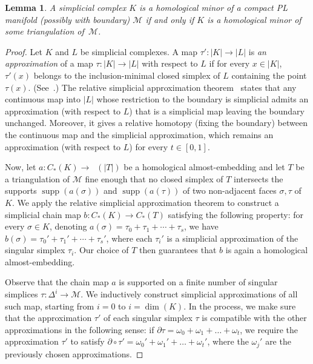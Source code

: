 \documentclass[a4paper,UKenglish,thm-restate]{article}
\newcommand{\M}{\mathcal{M}}
\DeclareMathOperator{\supp}{supp}
\DeclareMathOperator{\Csing}{C_*^{sing}}
\newtheorem{replemma}{Lemma}
\begin{document}
\setcounter{replemma}{7}
\begin{replemma}
    A simplicial complex $K$ is a homological minor of a compact PL manifold (possibly with boundary) $\M$ if and only if $K$ is a homological minor of some triangulation of~$\M$.
\end{replemma}
\begin{proof}
  Let $K$ and $L$ be simplicial complexes. A map $\tau':|K|\to |L|$ is \emph{an approximation} of a map $\tau:|K|\to |L|$ with respect to $L$ if for every $x\in |K|$, $\tau'(x)$ belongs to the inclusion-minimal closed simplex of $L$ containing the point $\tau(x)$. (See~\cite{zeeman1964relative}.) The relative simplicial approximation theorem~\cite{zeeman1964relative} states that any continuous map into $|L|$ whose restriction to the boundary is simplicial admits an approximation (with respect to $L$) that is a simplicial map leaving the boundary unchanged. Moreover, it gives a relative homotopy (fixing the boundary) between the continuous map and the simplicial approximation, which remains an approximation (with respect to $L$) for every $t\in[0,1]$.

\medskip
  
Now, let $a:C_*(K)\to\Csing(|T|)$ be a homological almost-embedding and let $T$ be a triangulation of $\M$ fine enough that no closed simplex of $T$ intersects the supports $\supp(a(\sigma))$ and $\supp(a(\tau))$ of two non-adjacent faces $\sigma,\tau$ of $K$. We apply the relative simplicial approximation theorem to construct a simplicial chain map $b \colon C_*(K)\longrightarrow C_*(T)$ satisfying the following property: for every $\sigma\in K$, denoting $a(\sigma)=\tau_0+\tau_1+\cdots+\tau_s$, we have $b(\sigma)=\tau_0'+\tau_1'+\cdots+\tau_s'$, where each $\tau_i'$ is a simplicial approximation of the singular simplex $\tau_i$. Our choice of $T$ then guarantees that $b$ is again a homological almost-embedding.

\medskip

Observe that the chain map $a$ is supported on a finite number of singular simplices $\tau:\Delta^i\to \M$. We inductively construct simplicial approximations of all such map, starting from $i=0$ to $i=\dim(K)$. In the process, we make sure that the approximation $\tau'$ of each singular simplex $\tau$ is compatible with the other approximations in the following sense: if $\partial \tau=\omega_0+\omega_1+\ldots+\omega_t$, we require the approximation $\tau'$ to satisfy $\partial\circ \tau'= \omega_0'+\omega_1'+\ldots+\omega_t'$, where the $\omega_j'$ are the previously chosen approximations.


\end{proof}
\end{document}
